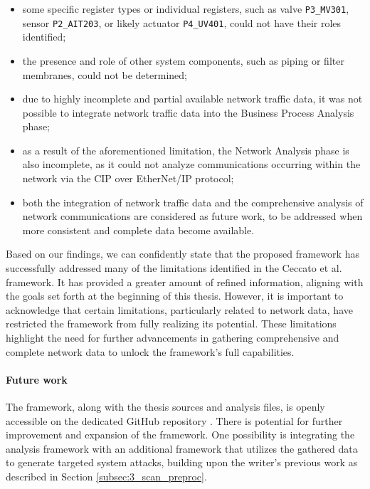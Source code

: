 \begin{itemize}
	\item some specific register types or individual registers, such as valve \texttt{P3\_MV301}, sensor \texttt{P2\_AIT203}, or likely actuator \texttt{P4\_UV401}, could not have their roles identified;
	\item the presence and role of other system components, such as piping or filter membranes, could not be determined;
	\item due to highly incomplete and partial available network traffic data, it was not possible to integrate network traffic data into the Business Process Analysis phase;
	\item as a result of the aforementioned limitation, the Network Analysis phase is also incomplete, as it could not analyze communications occurring within the network via the CIP over EtherNet/IP protocol;
	\item both the integration of network traffic data and the comprehensive analysis of network communications are considered as future work, to be addressed when more consistent and complete data become available.
\end{itemize}

Based on our findings, we can confidently state that the proposed framework has successfully addressed many of the limitations identified in the Ceccato et al. framework. It has provided a greater amount of refined information, aligning with the goals set forth at the beginning of this thesis. However, it is important to acknowledge that certain limitations, particularly related to network data, have restricted the framework from fully realizing its potential. These limitations highlight the need for further advancements in gathering comprehensive and complete network data to unlock the framework's full capabilities.

\paragraph{Future work}
\label{par:7_futurework}
The framework, along with the thesis sources and analysis files, is openly accessible on the dedicated GitHub repository \cite{repository_tesi}. There is potential for further improvement and expansion of the framework. One possibility is integrating the analysis framework with an additional framework that utilizes the gathered data to generate targeted system attacks, building upon the writer's previous work as described in Section \ref{subsec:3_scan_preproc}.

